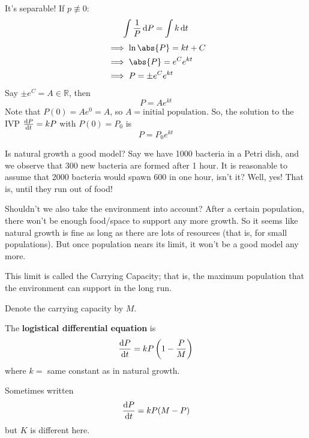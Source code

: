 It's separable! If $ p\not\equiv 0 $:
\[ \int \frac{1}{P}\odif{P}=\int k\odif{t}  \]
\begin{align*}
     & \implies \ln\abs{P}=kt+C    \\
     & \implies \abs{P}=e^C e^{kt} \\
     & \implies P=\pm e^{C}e^{kt}
\end{align*}
Say $ \pm e^C =A\in\mathbb{R} $, then
\[ P=Ae^{kt} \]
Note that $ P(0)=Ae^0=A $, so $ A=\text{initial population} $. So,
the solution to the IVP $ \odv{P}{t} =kP $ with $ P(0)=P_0 $ is
\[ P=P_0 e^{kt} \]

Is natural growth a good model? Say we have 1000 bacteria in a Petri
dish, and we observe that 300 new bacteria are formed after 1 hour.
It is reasonable to assume that 2000 bacteria would spawn 600 in one hour,
isn't it? Well, yes! That is, until they run out of food!

Shouldn't we also take the environment into account? After
a certain population, there won't be enough food/space to
support any more growth. So it seems like natural growth is fine
as long as there are lots of resources (that is, for small populations).
But once population nears its limit, it won't be a good model any more.

This limit is called the Carrying Capacity; that is, the maximum population
that the environment can support in the long run.

Denote the carrying capacity by $ M $.

\begin{Definition}{}{}
    The \textbf{logistical differential equation} is
    \[ \odv{P}{t}=kP\left( 1-\frac{P}{M}  \right) \]
    where $ k =$ same constant as in natural growth.
\end{Definition}
\begin{Remark}{}{}
    Sometimes written
    \[ \odv{P}{t}=kP(M-P)  \]
    but $ K $ is different here.
\end{Remark}

